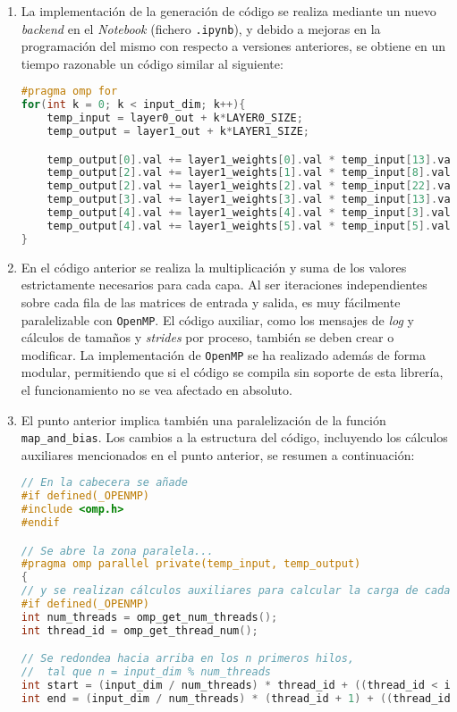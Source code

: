 \begin{enumerate}
    \item La implementación de la generación de código se realiza mediante un nuevo \textit{backend} en el \textit{Notebook} (fichero \texttt{.ipynb}), y debido a mejoras en la programación del mismo con respecto a versiones anteriores, se obtiene en un tiempo razonable un código similar al siguiente:\medskip
\begin{lstlisting}[language=C]
#pragma omp for
for(int k = 0; k < input_dim; k++){
    temp_input = layer0_out + k*LAYER0_SIZE;
    temp_output = layer1_out + k*LAYER1_SIZE;

    temp_output[0].val += layer1_weights[0].val * temp_input[13].val;
    temp_output[2].val += layer1_weights[1].val * temp_input[8].val;
    temp_output[2].val += layer1_weights[2].val * temp_input[22].val;
    temp_output[3].val += layer1_weights[3].val * temp_input[13].val;
    temp_output[4].val += layer1_weights[4].val * temp_input[3].val;
    temp_output[4].val += layer1_weights[5].val * temp_input[5].val;
}
\end{lstlisting}
    \item En el código anterior se realiza la multiplicación y suma de los valores estrictamente necesarios para cada capa. Al ser iteraciones independientes sobre cada fila de las matrices de entrada y salida, es muy fácilmente paralelizable con \texttt{OpenMP}. El código auxiliar, como los mensajes de \textit{log} y cálculos de tamaños y \textit{strides} por proceso, también se deben crear o modificar. La implementación de \texttt{OpenMP} se ha realizado además de forma modular, permitiendo que si el código se compila sin soporte de esta librería, el funcionamiento no se vea afectado en absoluto.
    \item El punto anterior implica también una paralelización de la función \texttt{map\_and\_bias}. Los cambios a la estructura del código, incluyendo los cálculos auxiliares mencionados en el punto anterior, se resumen a continuación:\medskip
\begin{lstlisting}[language=C]
// En la cabecera se añade
#if defined(_OPENMP)
#include <omp.h>
#endif

// Se abre la zona paralela...
#pragma omp parallel private(temp_input, temp_output)
{
// y se realizan cálculos auxiliares para calcular la carga de cada hilo
#if defined(_OPENMP)
int num_threads = omp_get_num_threads();
int thread_id = omp_get_thread_num();

// Se redondea hacia arriba en los n primeros hilos,
//  tal que n = input_dim % num_threads
int start = (input_dim / num_threads) * thread_id + ((thread_id < input_dim % num_threads) ? thread_id : input_dim % num_threads);
int end = (input_dim / num_threads) * (thread_id + 1) + ((thread_id < input_dim % num_threads) ? thread_id + 1 : input_dim % num_threads);


\end{lstlisting}
\end{enumerate}
